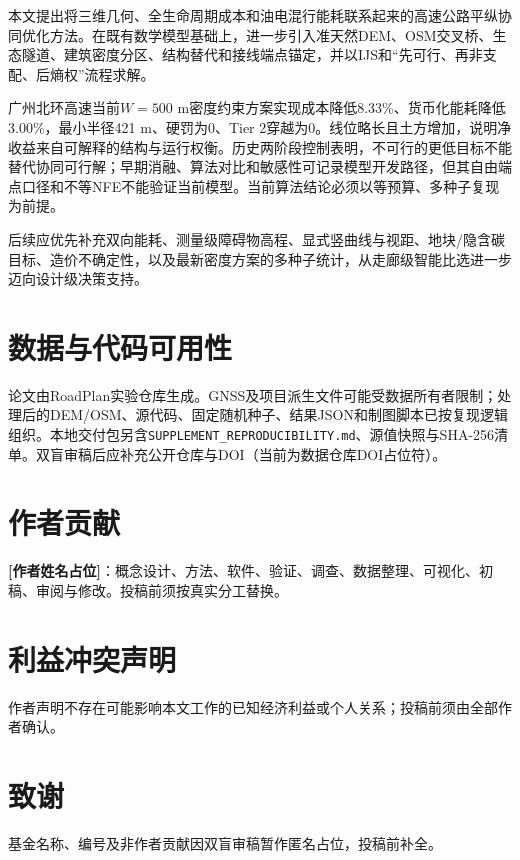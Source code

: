 \documentclass[preprint,12pt]{elsarticle}
\begin{document}
本文提出将三维几何、全生命周期成本和油电混行能耗联系起来的高速公路平纵协同优化方法。在既有数学模型基础上，进一步引入准天然DEM、OSM交叉桥、生态隧道、建筑密度分区、结构替代和接线端点锚定，并以IJS和“先可行、再非支配、后熵权”流程求解。

广州北环高速当前$W=500$ m密度约束方案实现成本降低8.33\%、货币化能耗降低3.00\%，最小半径421 m、硬罚为0、Tier 2穿越为0。线位略长且土方增加，说明净收益来自可解释的结构与运行权衡。历史两阶段控制表明，不可行的更低目标不能替代协同可行解；早期消融、算法对比和敏感性可记录模型开发路径，但其自由端点口径和不等NFE不能验证当前模型。当前算法结论必须以等预算、多种子复现为前提。

后续应优先补充双向能耗、测量级障碍物高程、显式竖曲线与视距、地块/隐含碳目标、造价不确定性，以及最新密度方案的多种子统计，从走廊级智能比选进一步迈向设计级决策支持。

\section*{数据与代码可用性}
论文由RoadPlan实验仓库生成。GNSS及项目派生文件可能受数据所有者限制；处理后的DEM/OSM、源代码、固定随机种子、结果JSON和制图脚本已按复现逻辑组织。本地交付包另含\texttt{SUPPLEMENT\_REPRODUCIBILITY.md}、源值快照与SHA-256清单。双盲审稿后应补充公开仓库与DOI（当前为数据仓库DOI占位符）。

\section*{作者贡献}
\textbf{[作者姓名占位]}：概念设计、方法、软件、验证、调查、数据整理、可视化、初稿、审阅与修改。投稿前须按真实分工替换。

\section*{利益冲突声明}
作者声明不存在可能影响本文工作的已知经济利益或个人关系；投稿前须由全部作者确认。

\section*{致谢}
基金名称、编号及非作者贡献因双盲审稿暂作匿名占位，投稿前补全。



\end{document}
